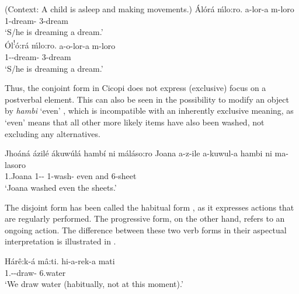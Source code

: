 \documentclass[output=paper]{langscibook}
\begin{document}
\z
\pagebreak
\ea
\label{bkm:Ref120706137}
(Context: A child is asleep and making movements.)
\ea
{Álórá ḿlo:ro.}\jambox*{[conjoint]}
\gll
a-lor-a  m-loro\\
1\SM{}-dream-\FV{}  3-dream\\
\glt
‘S/he is dreaming a dream.’\\


\ex
{Ól\textsuperscript{!}ó:rá ḿlo:ro.}\jambox*{[progressive]}
\gll
a-o-lor-a  m-loro\\
1\SM{}-\PROG{}-dream-\FV{}  3-dream\\
\glt
‘S/he is dreaming a dream.’\\

\z
\z

Thus, the conjoint form in Cicopi does not express (exclusive) focus on a postverbal element. This can also be seen in the possibility to modify an object by \textit{hambi} ‘even’ , which is incompatible with an inherently exclusive meaning, as ‘even’ means that all other more likely items have also been washed, not excluding any alternatives.

\ea
\label{bkm:Ref120706251}
{Jhoáná ázilé ákuwúlá hambí ni máláso:ro      }\jambox*{[conjoint]}
\gll
Joana  a-z-ile  a-kuwul-a  hambi  ni  ma-lasoro\\
1.Joana  1\SM{}-\LIM{}-\PFV{}  1\SM{}-wash-\FV{}  even  and  6-sheet\\
\glt
‘Joana washed even the sheets.’\\

\z

The disjoint form has been called the habitual form \citep{Nhantumbo2005}, as it expresses actions that are regularly performed. The progressive form, on the other hand, refers to an ongoing action. The difference between these two verb forms in their aspectual interpretation is illustrated in .

\ea
\label{bkm:Ref120706241}
\ea
{Hárê:k-á mâ:ti.     }\jambox*{[disjoint]}
\gll
hi-a-rek-a  mati\\
1\PL.\SM{}-\DJ{}-draw-\FV{}  6.water\\
\glt
‘We draw water (habitually, not at this moment).’\\
\end{document}
